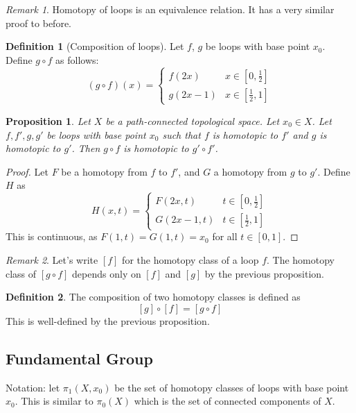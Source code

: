 \documentclass{article}
\theoremstyle{definition}
\newtheorem{defn}{Definition}[section]
\theoremstyle{plain}%
\newtheorem{prop}[thm]{Proposition}
\theoremstyle{remark}
\newtheorem*{rem}{Remark}
\begin{document}
\begin{rem}
    Homotopy of loops is an equivalence relation. It has a very similar proof to before.
\end{rem}

\begin{defn}[Composition of loops]
    Let $f$, $g$ be loops with base point $x_0$. Define $g \circ f$ as follows:
    \[(g \circ f)(x) = \begin{cases} f(2x) &x \in [0, \frac{1}{2}] \\ g(2x-1) &x\in [\frac{1}{2}, 1] \end{cases}\]
\end{defn}

\begin{prop}
    Let $X$ be a path-connected topological space. Let $x_0 \in X$. Let $f, f', g, g'$ be loops with base point $x_0$ such that $f$ is homotopic to $f'$ and $g$ is homotopic to $g'$. Then $g \circ f$ is homotopic to $g' \circ f'$.
\end{prop}

\begin{proof}
     Let $F$ be a homotopy from $f$ to $f'$, and $G$ a homotopy from $g$ to $g'$. Define $H$ as
     \[H(x,t) = \begin{cases} F(2x, t) &t \in [0, \frac{1}{2}] \\ G(2x-1, t) &t \in [\frac{1}{2}, 1] \end{cases}\]
     This is continuous, as $F(1, t) = G(1, t) = x_0$ for all $t \in [0,1]$.
\end{proof}

\begin{rem}
    Let's write $[f]$ for the homotopy class of a loop $f$. The homotopy class of $[g \circ f]$ depends only on $[f]$ and $[g]$ by the previous proposition.
\end{rem}

\begin{defn}
    The composition of two homotopy classes is defined as
    \[[g] \circ [f] = [g \circ f]\]
    This is well-defined by the previous proposition.
\end{defn}

\subsection{Fundamental Group}

Notation: let $\pi_1(X, x_0)$ be the set of homotopy classes of loops with base point $x_0$. This is similar to $\pi_0(X)$ which is the set of connected components of $X$.
\end{document}
